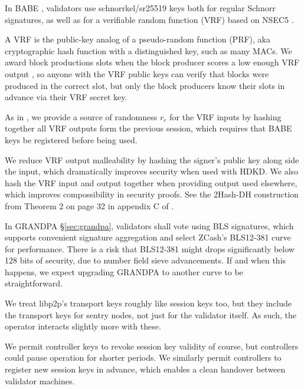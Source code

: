 In BABE , validators use schnorrkel/sr25519 keys both for regular Schnorr signatures, as well as for a verifiable random function (VRF) based on NSEC5 \cite{NSEC5}.  

A VRF is the public-key analog of a pseudo-random function (PRF), aka cryptographic hash function with a distinguished key, such as many MACs.  We award block productions slots when the block producer scores a low enough VRF output , so anyone with the VRF public keys can verify that blocks were produced in the correct slot, but only the block producers know their slots in advance via their VRF secret key.

As in \cite{Praos}, we provide a source of randomness $r_e$ for the VRF inputs by hashing together all VRF outputs form the previous session, which requires that BABE keys be registered  before being used.

We reduce VRF output malleability by hashing the signer's public key along side the input, which dramatically improves security when used with HDKD.  We also hash the VRF input and output together when providing output used elsewhere, which improves compossibility in security proofs. See the 2Hash-DH construction from Theorem 2 on page 32 in appendix C of \cite{Praos}.  

In GRANDPA \S\ref{sec:grandpa}, validators shall vote using BLS signatures, which supports convenient signature aggregation and select ZCash's BLS12-381 curve for performance.  There is a risk that BLS12-381 might drops significantly below 128 bits of security, due to number field sieve advancements.  If and when this happens, we expect upgrading GRANDPA to another curve to be straightforward. 


We treat libp2p's transport keys roughly like session keys too, but they include the transport keys for sentry nodes, not just for the validator itself.  As such, the operator interacts slightly more with these.

We permit controller keys to revoke session key validity of course, but controllers could pause operation for shorter periods.  We similarly permit controllers to register new session keys in advance, which enables a clean handover between validator machines.

